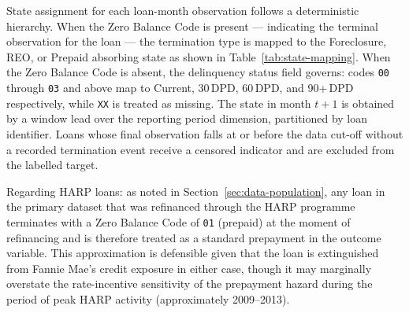 State assignment for each loan-month observation follows a
deterministic hierarchy.  When the Zero Balance Code is present ---
indicating the terminal observation for the loan --- the termination
type is mapped to the Foreclosure, REO, or Prepaid absorbing state as
shown in Table~\ref{tab:state-mapping}.  When the Zero Balance Code is
absent, the delinquency status field governs: codes \texttt{00}
through \texttt{03} and above map to Current, 30\,DPD, 60\,DPD, and
90+\,DPD respectively, while \texttt{XX} is treated as missing.  The
state in month $t+1$ is obtained by a window lead over the reporting
period dimension, partitioned by loan identifier.  Loans whose final
observation falls at or before the data cut-off without a recorded
termination event receive a censored indicator and are excluded from
the labelled target.

Regarding HARP loans: as noted in Section~\ref{sec:data-population},
any loan in the primary dataset that was refinanced through the
HARP programme terminates with a Zero Balance Code of \texttt{01}
(prepaid) at the moment of refinancing and is therefore treated as a
standard prepayment in the outcome variable.  This approximation is
defensible given that the loan is extinguished from Fannie Mae's
credit exposure in either case, though it may marginally overstate
the rate-incentive sensitivity of the prepayment hazard during the
period of peak HARP activity (approximately 2009--2013).

